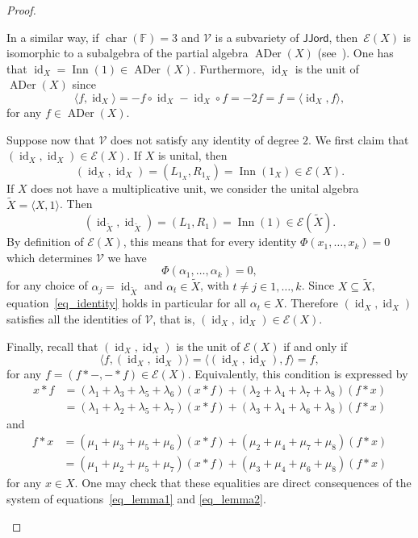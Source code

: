 \documentclass[reqno,a4paper]{amsart}
\theoremstyle{plain}
\theoremstyle{definition}
\theoremstyle{remark}
\numberwithin{equation}{section}
\newcommand{\F}{\mathbb{F}}
\newcommand{\E}{\mathcal{E}}
\newcommand{\V}{\mathcal{V}}
\DeclareMathOperator{\bchar}{char}
\DeclareMathOperator{\ADer}{ADer}
\DeclareMathOperator{\Inn}{Inn}
\DeclareMathOperator{\id}{id}
\newcommand{\JJord}{\ensuremath{\mathsf{JJord}}}
\begin{document}
\begin{proof}{\ }
\begin{enumerate}
In a similar way, if $\bchar(\F)=3$ and $\V$ is a subvariety of $\JJord$, then~$\E(X)$ is isomorphic to a subalgebra of the partial algebra $\ADer(X)$ (see~). One has that $\id_X=\Inn(1) \in \ADer(X)$. Furthermore, $\id_X$ is the unit of $\ADer(X)$ since
\[
\langle f,\id_X \rangle=-f \circ \id_X - \id_X \circ f=-2f=f=\langle \id_X,f \rangle,
\]
for any $f \in \ADer(X)$.

Suppose now that $\V$ does not satisfy any identity of degree $2$. We first claim that $(\id_X,\id_X)\in\E(X)$. If $X$ is unital, then
\[
(\id_X,\id_X) = (L_{1_X},R_{1_X}) = \Inn(1_X) \in \E(X).
\]
If $X$ does not have a multiplicative unit, we consider the unital algebra $\widetilde X=\langle X,1 \rangle$. Then
\[
(\id_{\widetilde X},\id_{\widetilde X}) = (L_1,R_1) = \Inn(1) \in \E(\widetilde X).
\]
By definition of $\E(X)$, this means that for every identity $\Phi(x_1,\ldots,x_k)=0$ which determines $\V$ we have
\begin{equation}\label{eq_identity}
\Phi(\alpha_1,\ldots,\alpha_k)=0,
\end{equation}
for any choice of $\alpha_j=\id_{\widetilde X}$ and $\alpha_t\in\widetilde X$, with $t \neq j \in 1,\ldots,k$. Since $X \subseteq \widetilde X$, equation~\eqref{eq_identity} holds in particular for all $\alpha_t\in X$. Therefore $(\id_X,\id_X)$ satisfies all the identities of $\V$, that is, $(\id_X,\id_X) \in \E(X)$.

Finally, recall that $(\id_X,\id_X)$ is the unit of $\E(X)$ if and only if
\[
\langle f, (\id_X, \id_X) \rangle = \langle (\id_X, \id_X), f \rangle = f,
\]
for any $f = (f \ast -, - \ast f) \in \E(X)$. Equivalently, this condition is expressed by
\begin{align*}
x \ast f
&= (\lambda_1+\lambda_3+\lambda_5+\lambda_6)(x \ast f)
 + (\lambda_2+\lambda_4+\lambda_7+\lambda_8)(f \ast x)\\
&= (\lambda_1+\lambda_2+\lambda_5+\lambda_7)(x \ast f)
 + (\lambda_3+\lambda_4+\lambda_6+\lambda_8)(f \ast x)
\end{align*}
and
\begin{align*}
f \ast x
&= (\mu_1+\mu_3+\mu_5+\mu_6)(x \ast f)
 + (\mu_2+\mu_4+\mu_7+\mu_8)(f \ast x)\\
&= (\mu_1+\mu_2+\mu_5+\mu_7)(x \ast f)
 + (\mu_3+\mu_4+\mu_6+\mu_8)(f \ast x)
\end{align*}
for any $x \in X$. One may check that these equalities are direct consequences of the system of equations~\eqref{eq_lemma1} and \eqref{eq_lemma2}.
\end{enumerate}
\end{proof}
\end{document}

